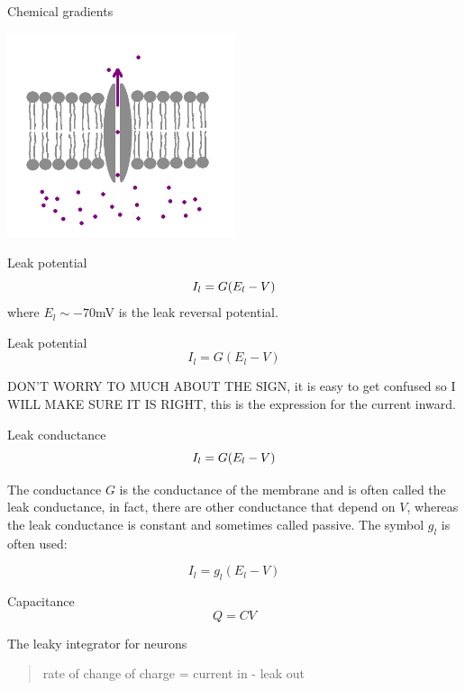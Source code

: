 \documentclass{beamer}
\newcommand{\crish}{\color{reddish}}
\newcommand{\cbla}{\color{black}}
\newcommand{\cred}{\color{red}}
\newcommand{\cblu}{\color{blue}}
\begin{document}
\begin{frame}{Chemical gradients}
  \begin{center}
    \includegraphics[height=6cm]{passive_channel.png}
  \end{center}
\end{frame}


\begin{frame}{Leak potential}
  \crish
  $$I_l=G(\cred{}E_l\crish{}-V)$$
\cbla{}
  where \cred$E_l\sim -70$mV\cbla{} is the \cblu{}leak reversal potential\cbla{}. 
\end{frame}


\begin{frame}{Leak potential}
  \crish
  $$I_l=G(E_l-V)$$
\cbla{}

DON'T WORRY TO MUCH ABOUT THE SIGN, it is easy to get confused so I
WILL MAKE SURE IT IS RIGHT, this is the expression for the current
inward.
\end{frame}



\begin{frame}{Leak conductance}
  \crish
  $$I_l=\cred{}G\crish{}(E_l-V)$$

  \cbla{} The conductance \cred$G$\cbla{} is the conductance of the membrane and is often called the \cblu{}leak conductance\cbla{}, in fact, there are other conductance that depend on \crish$V$\cbla{}, whereas the leak conductance is constant and sometimes called \cblu{}passive\cbla{}. The symbol \cred{}$g_l$\cbla{} is often used:

  \crish
  $$I_l=g_l(E_l-V)$$
\cbla{}
\end{frame}


\begin{frame}{Capacitance}
\crish
$$Q=CV$$
\cbla
\end{frame}


\begin{frame}{The leaky integrator for neurons}
\begin{quote}
  rate of change of charge = current in - leak out
\end{quote}
\end{frame}
\end{document}
